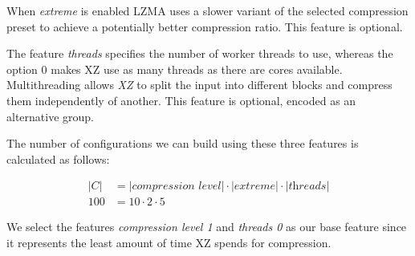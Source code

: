 When \emph{extreme} is enabled \textsc{LZMA} uses a slower variant of the selected compression preset to achieve a potentially better compression ratio.
This feature is optional.

The feature \emph{threads} specifies the number of worker threads to use, whereas the option $0$ makes \textsc{XZ}  use as many threads as there are cores available.
Multithreading allows \emph{XZ} to split the input into different blocks and compress them independently of another.
This feature is optional, encoded as an alternative group.


The number of configurations we can build using these three features is calculated as follows:

\begin{align}
    \lvert C \rvert &= \lvert \textit{compression level} \rvert \cdot \lvert \textit{extreme} \rvert \cdot \lvert \textit{threads} \rvert \\
    100 &= 10 \cdot 2 \cdot 5 \nonumber
\end{align}

We select the features \emph{compression level 1} and \emph{threads 0} as our base feature since it represents the least amount of time 
\textsc{XZ} spends for compression.
